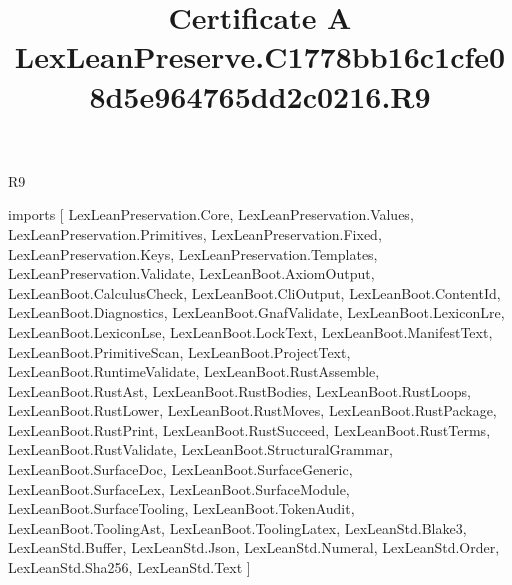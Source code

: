\begin{lexlean}{R9}
\title{Certificate A LexLeanPreserve.C1778bb16c1cfe08d5e964765dd2c0216.R9}
\begin{coremodule}
imports [
  LexLeanPreservation.Core,
  LexLeanPreservation.Values,
  LexLeanPreservation.Primitives,
  LexLeanPreservation.Fixed,
  LexLeanPreservation.Keys,
  LexLeanPreservation.Templates,
  LexLeanPreservation.Validate,
  LexLeanBoot.AxiomOutput,
  LexLeanBoot.CalculusCheck,
  LexLeanBoot.CliOutput,
  LexLeanBoot.ContentId,
  LexLeanBoot.Diagnostics,
  LexLeanBoot.GnafValidate,
  LexLeanBoot.LexiconLre,
  LexLeanBoot.LexiconLse,
  LexLeanBoot.LockText,
  LexLeanBoot.ManifestText,
  LexLeanBoot.PrimitiveScan,
  LexLeanBoot.ProjectText,
  LexLeanBoot.RuntimeValidate,
  LexLeanBoot.RustAssemble,
  LexLeanBoot.RustAst,
  LexLeanBoot.RustBodies,
  LexLeanBoot.RustLoops,
  LexLeanBoot.RustLower,
  LexLeanBoot.RustMoves,
  LexLeanBoot.RustPackage,
  LexLeanBoot.RustPrint,
  LexLeanBoot.RustSucceed,
  LexLeanBoot.RustTerms,
  LexLeanBoot.RustValidate,
  LexLeanBoot.StructuralGrammar,
  LexLeanBoot.SurfaceDoc,
  LexLeanBoot.SurfaceGeneric,
  LexLeanBoot.SurfaceLex,
  LexLeanBoot.SurfaceModule,
  LexLeanBoot.SurfaceTooling,
  LexLeanBoot.TokenAudit,
  LexLeanBoot.ToolingAst,
  LexLeanBoot.ToolingLatex,
  LexLeanStd.Blake3,
  LexLeanStd.Buffer,
  LexLeanStd.Json,
  LexLeanStd.Numeral,
  LexLeanStd.Order,
  LexLeanStd.Sha256,
  LexLeanStd.Text
]


\end{coremodule}
\end{lexlean}
